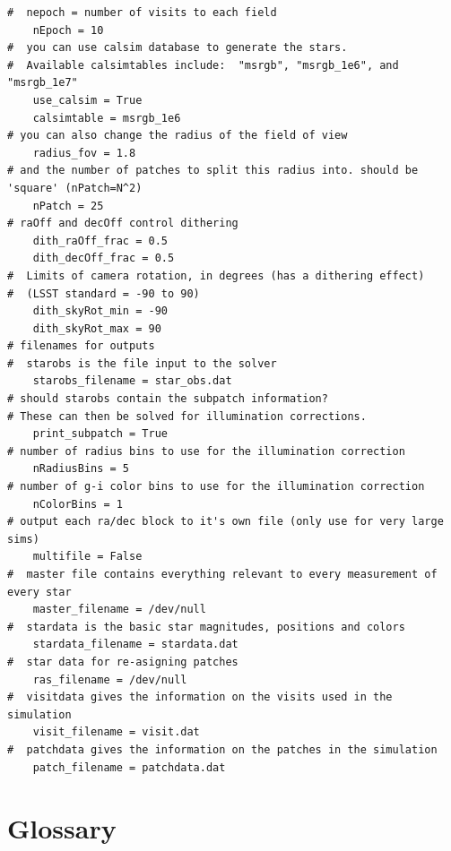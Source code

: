\documentclass[12pt,preprint]{aastex}
\begin{document}
\begin{verbatim}
#  nepoch = number of visits to each field
    nEpoch = 10
#  you can use calsim database to generate the stars.  
#  Available calsimtables include:  "msrgb", "msrgb_1e6", and "msrgb_1e7"
    use_calsim = True
    calsimtable = msrgb_1e6
# you can also change the radius of the field of view
    radius_fov = 1.8
# and the number of patches to split this radius into. should be 'square' (nPatch=N^2)
    nPatch = 25
# raOff and decOff control dithering
    dith_raOff_frac = 0.5
    dith_decOff_frac = 0.5
#  Limits of camera rotation, in degrees (has a dithering effect) 
#  (LSST standard = -90 to 90)
    dith_skyRot_min = -90
    dith_skyRot_max = 90
# filenames for outputs
#  starobs is the file input to the solver
    starobs_filename = star_obs.dat
# should starobs contain the subpatch information?  
# These can then be solved for illumination corrections.
    print_subpatch = True
# number of radius bins to use for the illumination correction
    nRadiusBins = 5
# number of g-i color bins to use for the illumination correction
    nColorBins = 1
# output each ra/dec block to it's own file (only use for very large sims)
    multifile = False
#  master file contains everything relevant to every measurement of every star
    master_filename = /dev/null
#  stardata is the basic star magnitudes, positions and colors
    stardata_filename = stardata.dat
#  star data for re-asigning patches
    ras_filename = /dev/null
#  visitdata gives the information on the visits used in the simulation
    visit_filename = visit.dat
#  patchdata gives the information on the patches in the simulation 
    patch_filename = patchdata.dat 
\end{verbatim}



\section{Glossary}
\label{sec:glossary}
\end{document}
